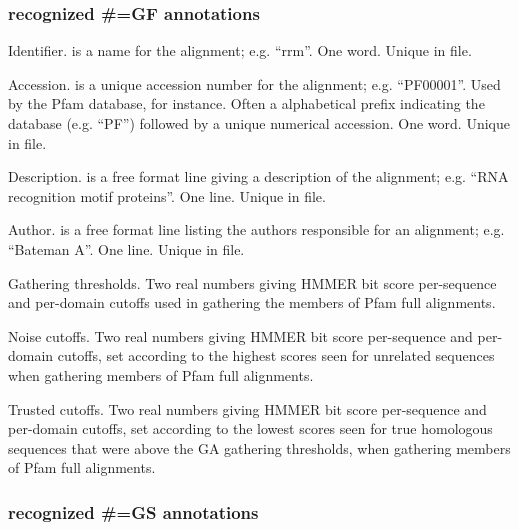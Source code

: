 \subsubsection{recognized \#=GF annotations}
\begin{wideitem}
\item [\emprog{ID  <s>}] 
        Identifier.  is a name for the alignment;
        e.g. ``rrm''. One word. Unique in file.

\item [\emprog{AC  <s>}]
        Accession.  is a unique accession number for the
        alignment; e.g. 
        ``PF00001''. Used by the Pfam database, for instance. 
        Often a alphabetical prefix indicating the database
        (e.g. ``PF'') followed by a unique numerical accession.
        One word. Unique in file. 
        
\item [\emprog{DE  <s>}]
        Description.  is a free format line giving
        a description of the alignment; e.g.
        ``RNA recognition motif proteins''. One line. Unique in file.

\item [\emprog{AU  <s>}]
        Author.  is a free format line listing the 
        authors responsible for an alignment; e.g. 
        ``Bateman A''. One line. Unique in file.

\item [\emprog{GA  <f> <f>}]
        Gathering thresholds. Two real numbers giving HMMER bit score
        per-sequence and per-domain cutoffs used in gathering the
        members of Pfam full alignments. 
        
\item [\emprog{NC  <f> <f>}]
        Noise cutoffs. Two real numbers giving HMMER bit score
        per-sequence and per-domain cutoffs, set according to the
        highest scores seen for unrelated sequences when gathering
        members of Pfam full alignments.

\item [\emprog{TC  <f> <f>}]
        Trusted cutoffs. Two real numbers giving HMMER bit score
        per-sequence and per-domain cutoffs, set according to the
        lowest scores seen for true homologous sequences that
        were above the GA gathering thresholds, when gathering
        members of Pfam full alignments. 
\end{wideitem}

\subsubsection{recognized \#=GS annotations}

